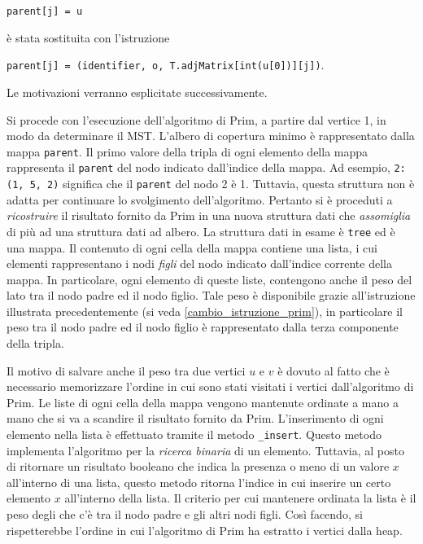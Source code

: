 \verb|parent[j] = u|

è stata sostituita con l'istruzione

\verb|parent[j] = (identifier, o, T.adjMatrix[int(u[0])][j])|. 

Le motivazioni verranno esplicitate successivamente.

Si procede con l'esecuzione dell'algoritmo di Prim, a partire dal vertice 1, in modo da 
determinare il MST. L'albero di copertura minimo è rappresentato dalla mappa 
\verb|parent|. Il primo valore della tripla di ogni elemento della mappa rappresenta 
il \verb|parent| del nodo indicato dall'indice della mappa. Ad esempio, 
\verb|2: (1, 5, 2)| significa che il \verb|parent| del nodo 2 è 1. Tuttavia, 
questa struttura non è adatta per continuare lo svolgimento dell'algoritmo. 
Pertanto si è proceduti a \textit{ricostruire} il risultato fornito da Prim in una nuova 
struttura dati che \textit{assomiglia} di più ad una struttura dati ad albero. La 
struttura dati in esame è \verb|tree| ed è una mappa. Il contenuto di ogni cella della 
mappa contiene una lista, i cui elementi rappresentano i nodi \textit{figli} del nodo 
indicato dall'indice corrente della mappa. In particolare, ogni elemento di queste 
liste, contengono anche il peso del lato tra il nodo padre ed il nodo figlio. Tale peso 
è disponibile grazie all'istruzione illustrata precedentemente (si veda 
\ref{cambio_istruzione_prim}), in particolare il peso tra il nodo padre ed il nodo figlio 
è rappresentato dalla terza componente della tripla.

Il motivo di salvare anche il peso tra due vertici $u$ e $v$ è dovuto al fatto che è 
necessario memorizzare l'ordine in cui sono stati visitati i vertici dall'algoritmo di Prim. 
Le liste di ogni cella della mappa vengono mantenute ordinate a mano a mano che si va 
a scandire il risultato fornito da Prim. L'inserimento di ogni elemento nella lista è 
effettuato tramite il metodo \verb|_insert|. Questo metodo implementa l'algoritmo per la 
\textit{ricerca binaria} di un elemento. Tuttavia, al posto di ritornare un risultato 
booleano che indica la presenza o meno di un valore $x$ all'interno di una lista, 
questo metodo ritorna l'indice in cui inserire un certo elemento $x$ all'interno della lista. 
Il criterio per cui mantenere ordinata la lista è il peso degli che c'è tra il nodo padre 
e gli altri nodi figli. Così facendo, si rispetterebbe l'ordine in cui l'algoritmo di Prim 
ha estratto i vertici dalla heap.


